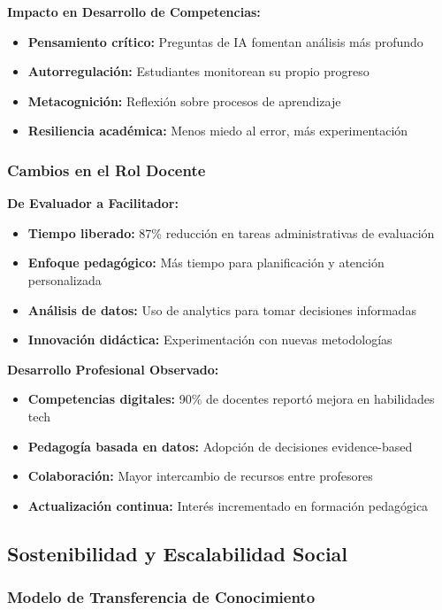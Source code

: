 \documentclass[12pt,a4paper]{report}
\begin{document}
\textbf{Impacto en Desarrollo de Competencias:}
\begin{itemize}
\item \textbf{Pensamiento crítico:} Preguntas de IA fomentan análisis más profundo
\item \textbf{Autorregulación:} Estudiantes monitorean su propio progreso
\item \textbf{Metacognición:} Reflexión sobre procesos de aprendizaje
\item \textbf{Resiliencia académica:} Menos miedo al error, más experimentación
\end{itemize}

\subsubsection{Cambios en el Rol Docente}

\textbf{De Evaluador a Facilitador:}
\begin{itemize}
\item \textbf{Tiempo liberado:} 87\% reducción en tareas administrativas de evaluación
\item \textbf{Enfoque pedagógico:} Más tiempo para planificación y atención personalizada
\item \textbf{Análisis de datos:} Uso de analytics para tomar decisiones informadas
\item \textbf{Innovación didáctica:} Experimentación con nuevas metodologías
\end{itemize}

\textbf{Desarrollo Profesional Observado:}
\begin{itemize}
\item \textbf{Competencias digitales:} 90\% de docentes reportó mejora en habilidades tech
\item \textbf{Pedagogía basada en datos:} Adopción de decisiones evidence-based
\item \textbf{Colaboración:} Mayor intercambio de recursos entre profesores
\item \textbf{Actualización continua:} Interés incrementado en formación pedagógica
\end{itemize}

\subsection{Sostenibilidad y Escalabilidad Social}

\subsubsection{Modelo de Transferencia de Conocimiento}
\end{document}
